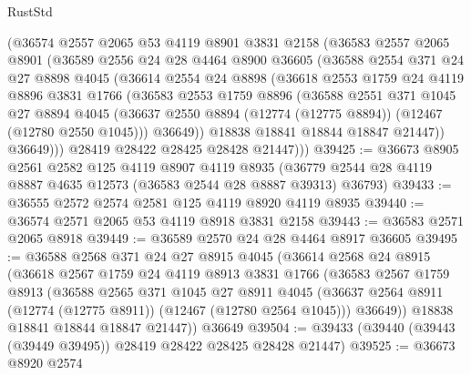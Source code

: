 \begin{lexlean}{RustStd}
\begin{coremodule}
        (@36574
          @2557
          @2065
          @53
          @4119
          @8901
          @3831
          @2158
          (@36583
            @2557
            @2065
            @8901
            (@36589
              @2556
              @24
              @28
              @4464
              @8900
              @36605
              (@36588
                @2554
                @371
                @24
                @27
                @8898
                @4045
                (@36614
                  @2554
                  @24
                  @8898
                  (@36618
                    @2553
                    @1759
                    @24
                    @4119
                    @8896
                    @3831
                    @1766
                    (@36583
                      @2553
                      @1759
                      @8896
                      (@36588
                        @2551
                        @371
                        @1045
                        @27
                        @8894
                        @4045
                        (@36637 @2550 @8894 (@12774 (@12775 @8894)) (@12467 (@12780 @2550 @1045)))
                        @36649))
                    @18838
                    @18841
                    @18844
                    @18847
                    @21447))
                @36649)))
          @28419
          @28422
          @28425
          @28428
          @21447)))
@39425 := @36673
    @8905
    @2561
    @2582
    @125
    @4119
    @8907
    @4119
    @8935
    (@36779 @2544 @28 @4119 @8887 @4635 @12573 (@36583 @2544 @28 @8887 @39313) @36793)
@39433 := @36555 @2572 @2574 @2581 @125 @4119 @8920 @4119 @8935
@39440 := @36574 @2571 @2065 @53 @4119 @8918 @3831 @2158
@39443 := @36583 @2571 @2065 @8918
@39449 := @36589 @2570 @24 @28 @4464 @8917 @36605
@39495 := @36588
    @2568
    @371
    @24
    @27
    @8915
    @4045
    (@36614
      @2568
      @24
      @8915
      (@36618
        @2567
        @1759
        @24
        @4119
        @8913
        @3831
        @1766
        (@36583
          @2567
          @1759
          @8913
          (@36588
            @2565
            @371
            @1045
            @27
            @8911
            @4045
            (@36637 @2564 @8911 (@12774 (@12775 @8911)) (@12467 (@12780 @2564 @1045)))
            @36649))
        @18838
        @18841
        @18844
        @18847
        @21447))
    @36649
@39504 := @39433 (@39440 (@39443 (@39449 @39495)) @28419 @28422 @28425 @28428 @21447)
@39525 := @36673
    @8920
    @2574

\end{coremodule}
\end{lexlean}
